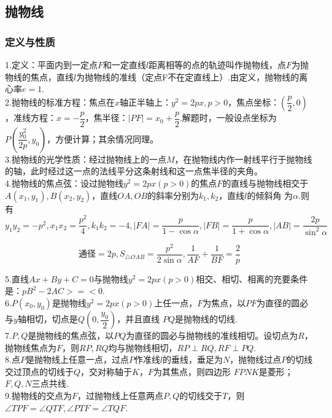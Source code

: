 \subsection{抛物线}
\subsubsection{定义与性质}
1.定义：平面内到一定点$F$和一定直线$l$距离相等的点的轨迹叫作抛物线，点$F$为抛物线的焦点，直线$l$为抛物线的准线（定点F不在定直线上）.由定义，抛物线的离心率$e=1$.
~\\

2.抛物线的标准方程：焦点在$x$轴正半轴上：$y^2=2px,p>0$，焦点坐标：$(\dfrac{p}{2},0)$，准线方程：$x=-\dfrac{p}{2}$，焦半径：$|PF|=x_0+\dfrac{p}{2}$.解题时，一般设点坐标为$P(\dfrac{y_0^2}{2p},y_0)$，方便计算；其余情况同理。
~\\

3.抛物线的光学性质：经过抛物线上的一点$M$，在抛物线内作一射线平行于抛物线的轴，此时经过这一点的法线平分这条射线和这一点焦半径的夹角。
~\\

4.抛物线的焦点弦：设过抛物线$y^2=2px(p>0)$的焦点$F$的直线与抛物线相交于$A(x_1,y_1),B(x_2,y_2)$，直线$OA,OB$的斜率分别为$k_1,k_2$，直线$l$的倾斜角
为$\alpha$.则有
$$y_1y_2=-p^2,x_1x_2=\dfrac{p^2}{4},k_1k_2=-4,|FA|=\dfrac{p}{1-\cos{\alpha}},|FB|=\dfrac{p}{1+\cos{\alpha}},|AB|=\dfrac{2p}{\sin^2{\alpha}}$$

$$\text{通径}=2p,S_{\bigtriangleup OAB}=\dfrac{p^2}{2\sin{\alpha}},\dfrac{1}{AF}+\dfrac{1}{BF}=\dfrac{2}{p}$$

5.直线$Ax+By+C=0$与抛物线$y^2=2px(p>0)$相交、相切、相离的充要条件是：$pB^2-2AC>=<0$.
~\\

6.$P(x_0,y_0)$是抛物线$y^2=2px(p>0)$上任一点，$F$为焦点，以$PF$为直径的圆必与$y$轴相切，切点是$Q(0,\dfrac{y_0}{2})$，并且直线
$PQ$是抛物线的切线.
~\\

7.$P,Q$是抛物线的焦点弦，以$PQ$为直径的圆必与抛物线的准线相切。设切点为$R$，抛物线焦点为$F$，则$RP,RQ$均与抛物线相切，$RP\perp RQ,RF\perp PQ$.
~\\

8.点$P$是抛物线上任意一点，过点$P$作准线$l$的垂线，垂足为$N$，抛物线过点$P$的切线交过顶点的切线于$Q$，交对称轴于$K$，$F$为其焦点，则四边形
$FPNK$是菱形；$F,Q,N$三点共线.
~\\

9.抛物线的交点为$F$，过抛物线上任意两点$P,Q$的切线交于$T$，则$\angle{TPF}=\angle{QTF},\angle{PTF}=\angle{TQF}$.
~\\

